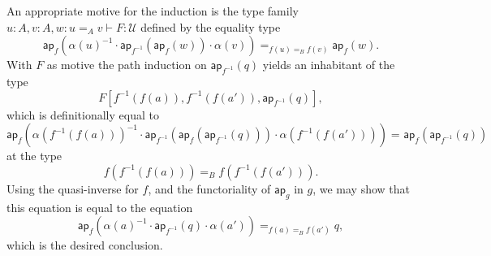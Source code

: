 \documentclass{article}
\newcommand{\idty}[3]{{#2}\mathbin{=_{#1}}{#3}}
\newcommand{\app}[2]{{#1}({#2})}
\newcommand{\pa}[1]{\mathsf{ap}_{#1}}
\newcommand{\univty}{\mathcal{U}}
\newcommand{\iv}[1]{#1^{-1}}
\newcommand{\concat}[2]{{#1}\cdot{#2}}
\begin{document}
An appropriate motive for the induction is the type family
$u{:}A,v{:}A,w{:}\idty{A}{u}{v}\vdash F:\univty$ defined by the equality type
\begin{displaymath}
  \idty{\idty{B}{\app{f}{u}}{\app{f}{v}}}{\app{\pa{f}}{\concat{\concat{\iv{\app{\alpha}{u}}}{\app{\pa{\iv{f}}}{\app{\pa{f}}{w}}}}{\app{\alpha}{v}}}}{\app{\pa{f}}{w}}.
\end{displaymath}
With $F$ as motive the path induction on $\app{\pa{\iv{f}}}{q}$ yields an inhabitant
of the type
$${F[\app{\iv{f}}{\app{f}{a}},\app{\iv{f}}{\app{f}{a'}},\app{\pa{\iv{f}}}{q}]},$$
which is definitionally equal to
\begin{displaymath}
  \idty{}
  {\app{\pa{f}}
    {\concat
      {\concat
        {\iv{\app{\alpha}{\app{\iv{f}}{\app{f}{a}}}}}
        {\app{\pa{\iv{f}}}{\app{\pa{f}}{\app{\pa{\iv{f}}}{q}}}}
      }
      {\app{\alpha}{\app{\iv{f}}{\app{f}{a'}}}}
    }
  }
  {\app{\pa{f}}{\app{\pa{\iv{f}}}{q}}}
\end{displaymath}
at the type
\begin{displaymath}
  \idty{B}{\app{f}{\app{\iv{f}}{\app{f}{a}}}}{\app{f}{\app{\iv{f}}{\app{f}{a'}}}}.
\end{displaymath}
Using the quasi-inverse for $f$, and the functoriality of $\pa{g}$ in $g$, we
may show that this equation is equal to the equation
\begin{displaymath}
  \idty
  {\idty{B}{\app{f}{a}}{\app{f}{a'}}}
  {\app{\pa{f}}
      {\concat
        {\concat
          {\iv{\app{\alpha}{{a}}}}
          {\app{\pa{\iv{f}}}{q}}
        }
        {\app{\alpha}{a'}}
      }
    }
    {q},
\end{displaymath}
which is the desired conclusion.
\end{document}
